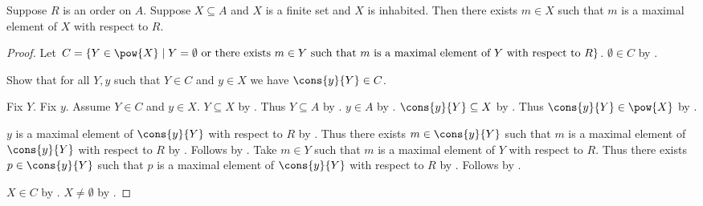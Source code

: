 \begin{theorem}\label{finite_maximal_element}
    Suppose $R$ is an order on $A$.
    Suppose $X\subseteq A$ and $X$ is a finite set and $X$ is inhabited.
    Then there exists $m\in X$ such that
        $m$ is a maximal element of $X$ with respect to $R$.
\end{theorem}
\begin{proof}
    Let $C=\{Y\in\pow{X}\mid
        \text{$Y=\emptyset$ or there exists $m\in Y$ such that
            $m$ is a maximal element of $Y$ with respect to $R$}\}$.
    $\emptyset\in C$ by .

    Show that for all $Y,y$ such that $Y\in C$ and $y\in X$ we have
        $\cons{y}{Y}\in C$.
    \begin{subproof}
        Fix $Y$.
        Fix $y$.
        Assume $Y\in C$ and $y\in X$.
        $Y\subseteq X$ by .
        Thus $Y\subseteq A$ by .
        $y\in A$ by .
        $\cons{y}{Y}\subseteq X$ by .
        Thus $\cons{y}{Y}\in\pow{X}$ by .
        \begin{byCase}
            $y$ is a maximal element of $\cons{y}{Y}$ with respect to $R$
                by .
            Thus there exists $m\in\cons{y}{Y}$ such that
                $m$ is a maximal element of $\cons{y}{Y}$ with respect to $R$
                by .
            Follows by \auto.
            Take $m\in Y$ such that
                $m$ is a maximal element of $Y$ with respect to $R$.
            Thus there exists $p\in\cons{y}{Y}$ such that
                $p$ is a maximal element of $\cons{y}{Y}$ with respect to $R$
                by .
            Follows by \auto.
        \end{byCase}
    \end{subproof}
    $X\in C$ by .
    $X\neq\emptyset$ by .
\end{proof}

